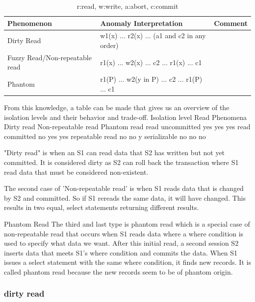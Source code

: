 \documentclass[a4paper,10pt,titlepage]{report}
\begin{document}
    \begin{table}[h]
        \begin{tabular}{|l|l|l|}
            \hline
            Phenomenon                     & Anomaly Interpretation                       & Comment \\\hline
            Dirty Read                     & w1(x) ... r2(x) ... (a1 and c2 in any order) &         \\\hline
            Fuzzy Read/Non-repeatable read & r1(x) ... w2(x) ... c2 ... r1(x) ... c1      &         \\\hline
            Phantom                        & r1(P) ... w2(y in P) ... c2 ... r1(P) ... c1 &         \\ \hline
        \end{tabular}
        \caption{r:read, w:write, a:abort, c:commit}
    \end{table}


    From this knowledge, a table can be made that gives us an overview of the isolation levels and their behavior and trade-off.
    Isolation level Read Phenomena
    Dirty read Non-repeatable read Phantom read
    read uncommitted yes yes yes
    read committed no yes yes
    repeatable read no no y
    serializable no no no


    "Dirty read" is when an S1 can read data that S2 has written but not yet committed. It is considered dirty as S2 can roll back the transaction where S1 read data that must be considered non-existent.

   
    The second case of 'Non-repeatable read' is when S1 reads data that is changed by S2 and committed. So if S1 rereads the same data, it will have changed. This results in two equal, select statements returning different results.

    Phantom Read
    The third and last type is phantom read which is a special case of non-repeatable read that occurs when S1 reads data where a where condition is used to specify what data we want. After this initial read, a second session S2 inserts data that meets S1's where condition and commits the data. When S1 issues a select statement with the same where condition, it finds new records. It is called phantom read because the new records seem to be of phantom origin.


    \subsubsection{dirty read}
\end{document}
